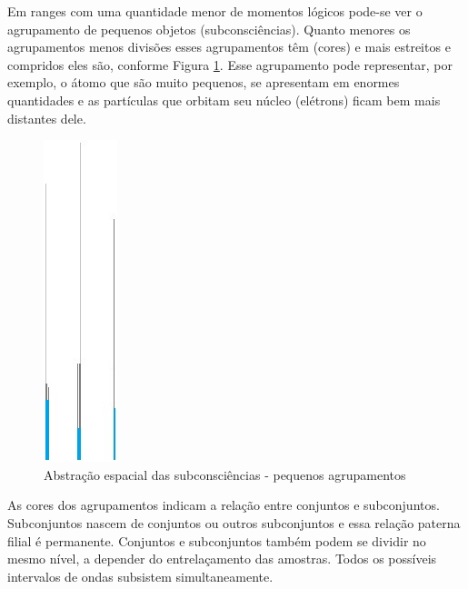 Em ranges com uma quantidade menor de momentos lógicos pode-se ver o agrupamento de pequenos objetos (subconsciências). Quanto menores os agrupamentos menos divisões esses agrupamentos têm (cores) e mais estreitos e compridos eles são, conforme Figura \ref{fig:consciousness_space_subconsciousness_min}. Esse agrupamento pode representar, por exemplo, o átomo que são muito pequenos, se apresentam em enormes quantidades e as partículas que orbitam seu núcleo (elétrons) ficam bem mais distantes dele.
	\begin{figure}[H]
	\caption{Abstração espacial das subconsciências - pequenos agrupamentos}
	\label{fig:consciousness_space_subconsciousness_min}
	\centering
	\includegraphics[scale=.7]{sections/images/consciousness_space_subconsciousness_min.jpg}
	\end{figure}
	
As cores dos agrupamentos indicam a relação entre conjuntos e subconjuntos. Subconjuntos nascem de conjuntos ou outros subconjuntos e essa relação paterna filial é permanente. Conjuntos e subconjuntos também podem se dividir no mesmo nível, a depender do entrelaçamento das amostras. Todos os possíveis intervalos de ondas subsistem simultaneamente.

